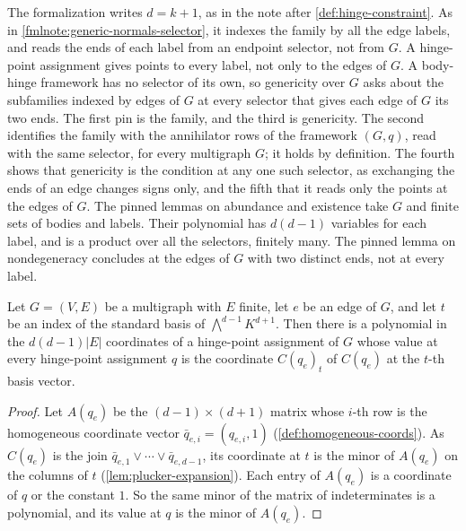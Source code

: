 \begin{fmlnote}
  The formalization writes $d = k + 1$, as in the note after
  \cref{def:hinge-constraint}. As in
  \cref{fmlnote:generic-normals-selector}, it indexes the family by all
  the edge labels, and reads the ends of each label from an endpoint
  selector, not from $G$. A hinge-point assignment gives points to
  every label, not only to the edges of $G$. A body-hinge framework has
  no selector of its own, so genericity over $G$ asks about the
  subfamilies indexed by edges of $G$ at every selector that gives each
  edge of $G$ its two ends. The first pin is the family, and the third
  is genericity. The second identifies the family with the annihilator
  rows of the framework $(G, q)$, read with the same selector, for
  every multigraph $G$; it holds by definition. The fourth shows that
  genericity is the condition at any one such selector, as exchanging
  the ends of an edge changes signs only, and the fifth that it reads
  only the points at the edges of $G$. The pinned lemmas on abundance
  and existence take $G$ and finite sets of bodies and labels. Their
  polynomial has $d(d-1)$ variables for each label, and is a product
  over all the selectors, finitely many. The pinned lemma on
  nondegeneracy concludes at the edges of $G$ with two distinct ends,
  not at every label.
\end{fmlnote}

\begin{lemma}
  \label{lem:hinge-rows-polynomial-in-points}
  \leanok
  Let $G = (V, E)$ be a multigraph with $E$ finite, let $e$ be an edge
  of $G$, and let $t$ be an index of the standard basis of
  $\bigwedge^{d-1}K^{d+1}$. Then there is a polynomial in the
  $d(d-1)|E|$ coordinates of a hinge-point assignment of $G$ whose
  value at every hinge-point assignment $q$ is the coordinate
  $C(q_e)_t$ of $C(q_e)$ at the $t$-th basis vector.
\end{lemma}
\begin{proof}
  \leanok
  Let $A(q_e)$ be the $(d-1) \times (d+1)$ matrix whose $i$-th row is
  the homogeneous coordinate vector $\bar q_{e,i} = (q_{e,i}, 1)$
  (\cref{def:homogeneous-coords}). As $C(q_e)$ is the join
  $\bar q_{e,1} \vee \cdots \vee \bar q_{e,d-1}$, its coordinate at
  $t$ is the minor of $A(q_e)$ on the columns of $t$
  (\cref{lem:plucker-expansion}). Each entry of $A(q_e)$ is a coordinate
  of $q$ or the constant $1$. So the same minor of the matrix of
  indeterminates is a polynomial, and its value at $q$ is the minor of
  $A(q_e)$.
\end{proof}

